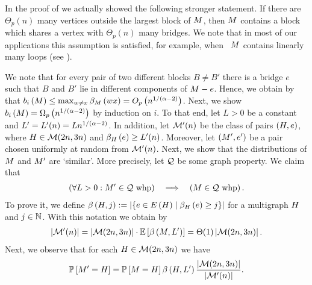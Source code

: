 \begin{remark}
	In the proof of  we actually showed the following stronger statement. If there are $\Theta_p(n)$ many vertices outside the largest block of $M$, then $M$ contains a block which shares a vertex with $\Theta_p(n)$ many bridges. We note that in most of our applications this assumption is satisfied, for example, when \whp\ $M$ contains linearly many loops (see ).
\end{remark}

We note that for every pair of two different blocks $B\neq B'$ there is a bridge $e$ such that $B$ and $B'$ lie in different components of $M-e$. Hence, we obtain by  that $b_{i}\left(M\right)\leq\max_{w\neq x}\beta_{M}\left(wx\right)=O_p\left(n^{1/\left(\alpha-2\right)}\right)$. Next, we show $b_{i}\left(M\right)=\Omega_p\left(n^{1/\left(\alpha-2\right)}\right)$ by induction on $i$. To that end, let $L>0$ be a constant and $L'=L'(n)=Ln^{1/(\alpha-2)}$. In addition, let $\mathcal{M}'(n)$ be the class of pairs $(H, e)$, where $H \in \mathcal{M}(2n,3n)$ and $\beta_{H}\left(e\right)\geq L'(n)$. Moreover, let $\left(M', e'\right)$ be a pair chosen uniformly at random from $\mathcal{M}'(n)$. 
Next, we show that the distributions of $M$ and $M'$ are \lq similar\rq. More precisely, let $\mathcal{Q}$ be some graph property. We claim that 
\begin{align}\label{CBeq:claim}
\left(\forall L>0: M' \in \mathcal{Q}~ \text{whp}\right) \quad \Longrightarrow \quad\left(M \in \mathcal{Q}~ \text{whp}\right).
\end{align}
To prove it, we define $\beta\left(H, j\right):=\left|\left\{e \in E\left(H\right)\mid \beta_{H}\left(e\right)\geq j\right\}\right|$ for a multigraph $H$ and $j\in \mathbb{N}$. With this notation we obtain by 
\begin{align}\label{CBeq:second_largest1}
\left|\mathcal{M}'(n)\right|=\left|\mathcal{M}(2n,3n)\right| \cdot \mathbb{E}\left[\beta\left(M, L'\right)\right]=\Theta(1)\left|\mathcal{M}(2n,3n)\right|.	
\end{align} Next, we observe that for each $H \in \mathcal{M}(2n,3n)$ we have 
\begin{align}\label{CBeq:second_largest2}
\mathbb{P}\left[M'=H\right]=\mathbb{P}\left[M=H\right]\beta\left(H, L'\right)\frac{\left|\mathcal{M}(2n,3n)\right|}{\left|\mathcal{M}'(n)\right|}.
\end{align}
